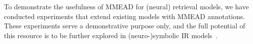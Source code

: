 


To demonstrate the usefulness of MMEAD for (neural) retrieval models, we have conducted experiments that extend existing models with MMEAD annotations.
These experiments serve a demonstrative purpose only, and the full potential of this resource is to be further explored in (neuro-)symbolic IR models~\citep{Gerritse22,Tran:2022:DRE}.

